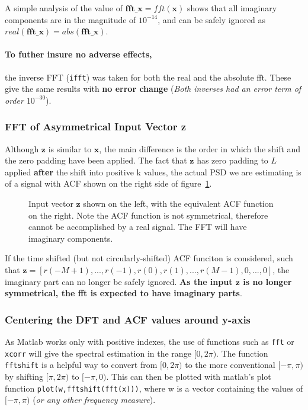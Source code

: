 \documentclass[main.tex]{subfiles}
\begin{document}
A simple analysis of the value of $\textbf{fft\_x} = fft(\textbf{x})$ shows that all imaginary components are in the magnitude of $10^{-14}$, and can be safely ignored as $real(\textbf{fft\_x}) = abs(\textbf{fft\_x})$. 

\paragraph{To futher insure no adverse effects,} the inverse FFT ({\tt ifft}) was taken for both the real and the absolute fft. These give the same results with \textbf{no error change} (\textit{Both inverses had an error term of order $10^{-30}$}).


\subsubsection{FFT of Asymmetrical Input Vector z}

Although $\textbf{z}$ is similar to $\textbf{x}$, the main difference is the order in which the shift and the zero padding have been applied. The fact that $\textbf{z}$ has zero padding  to $L$ applied \textbf{after} the shift into positive k values, the actual PSD we are estimating is of a signal with ACF shown on the right side of figure~\ref{fig:q1_2_c}.

\begin{figure}[H]
	\centering 
	\resizebox{0.8\textwidth}{!}{}
	\caption{Input vector $\textbf{z}$ shown on the left, with the equivalent ACF function on the right. Note the ACF function is not symmetrical, therefore cannot be accomplished by a real signal. The FFT will have imaginary components.}
	\label{fig:q1_2_c}
\end{figure}

If the time shifted (but not circularly-shifted) ACF funciton is considered, such that $\textbf{z}=[r(-M+1),...,r(-1),r(0),r(1),...,r(M-1),0,...,0]$, the imaginary part can no longer be safely ignored. \textbf{As the input $\textbf{z}$ is no longer 
symmetrical, the fft is expected to have imaginary parts}.

\subsubsection{Centering the DFT and ACF values around y-axis}

As Matlab works only with positive indexes, the use of functions such as {\tt fft} or {\tt xcorr} will give the spectral estimation in the range $[0,2\pi)$. The function {\tt fftshift} is a helpful way to convert from $[0,2\pi)$ to the more conventional $[-\pi,\pi)$ by shifting $[\pi, 2\pi)$ to $[-\pi, 0)$. This can then be plotted with matlab's plot function {\tt plot(w,fftshift(fft(x)))}, where w is a vector containing the values of $[-\pi,\pi)$ (\textit{or any other frequency measure}).
\end{document}
